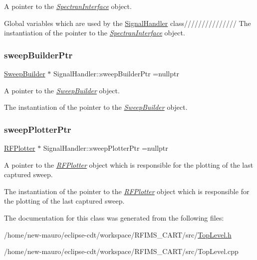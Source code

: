 A pointer to the {\itshape \hyperlink{classSpectranInterface}{Spectran\+Interface}} object. 

Global variables which are used by the \hyperlink{classSignalHandler}{Signal\+Handler} class/////////////// The instantiation of the pointer to the {\itshape \hyperlink{classSpectranInterface}{Spectran\+Interface}} object. \mbox{\label{classSignalHandler_a23ec28699521fb435a5eb90f2c36bccb}} 
\subsubsection{\texorpdfstring{sweep\+Builder\+Ptr}{sweepBuilderPtr}}
{\footnotesize\ttfamily \hyperlink{classSweepBuilder}{Sweep\+Builder} $\ast$ Signal\+Handler\+::sweep\+Builder\+Ptr =nullptr\hspace{0.3cm}{\ttfamily [static]}}



A pointer to the {\itshape \hyperlink{classSweepBuilder}{Sweep\+Builder}} object. 

The instantiation of the pointer to the {\itshape \hyperlink{classSweepBuilder}{Sweep\+Builder}} object. \mbox{\label{classSignalHandler_a7ec978dc8c16c31aa8faefe4e350302c}} 
\subsubsection{\texorpdfstring{sweep\+Plotter\+Ptr}{sweepPlotterPtr}}
{\footnotesize\ttfamily \hyperlink{classRFPlotter}{R\+F\+Plotter} $\ast$ Signal\+Handler\+::sweep\+Plotter\+Ptr =nullptr\hspace{0.3cm}{\ttfamily [static]}}



A pointer to the {\itshape \hyperlink{classRFPlotter}{R\+F\+Plotter}} object which is responsible for the plotting of the last captured sweep. 

The instantiation of the pointer to the {\itshape \hyperlink{classRFPlotter}{R\+F\+Plotter}} object which is responsible for the plotting of the last captured sweep. 

The documentation for this class was generated from the following files\+:\begin{DoxyCompactItemize}
\item 
/home/new-\/mauro/eclipse-\/cdt/workspace/\+R\+F\+I\+M\+S\+\_\+\+C\+A\+R\+T/src/\hyperlink{TopLevel_8h}{Top\+Level.\+h}\item 
/home/new-\/mauro/eclipse-\/cdt/workspace/\+R\+F\+I\+M\+S\+\_\+\+C\+A\+R\+T/src/Top\+Level.\+cpp\end{DoxyCompactItemize}

